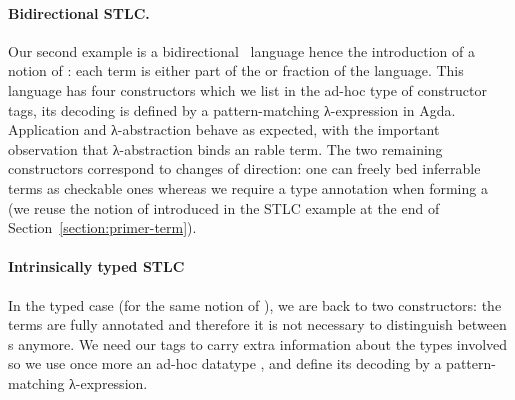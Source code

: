 \begin{center}
\end{center}

\paragraph{Bidirectional STLC.}\label{par:bidirectional} Our second example is a
bidirectional~\cite{pierce2000local} language hence the introduction of a
notion of : each term is either part of the  or
 fraction of the language. This language has four constructors
which we list in the ad-hoc  type of constructor tags, its
decoding  is defined by a pattern-matching λ-expression in Agda.
Application and λ-abstraction behave as expected, with the important
observation that λ-abstraction binds an rable term. The two
remaining constructors correspond to changes of direction: one can freely
bed inferrable terms as checkable ones whereas we require a type
annotation when forming a  (we reuse the notion of  introduced
in the STLC example at the end of Section~\ref{section:primer-term}). %

\begin{center}
\begin{minipage}[t]{0.35\textwidth}
\end{minipage}\quad
\begin{minipage}[t]{0.5\textwidth}
\end{minipage}
\end{center}

\paragraph{Intrinsically typed STLC}\label{par:intrinsicSTLC}
In the typed case (for the same notion of ), we are back to two
constructors: the terms are fully annotated and therefore it is not necessary
to distinguish between s anymore. We need our tags to carry extra
information about the types involved so we use once more an ad-hoc datatype
, and define its decoding  by a pattern-matching λ-expression.

